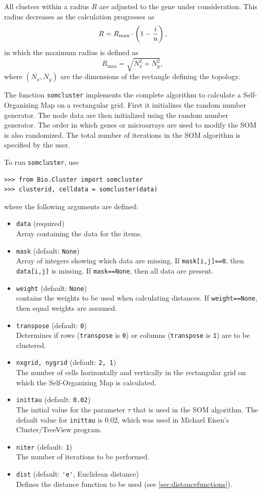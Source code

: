 \documentclass{report}
\begin{document}
All clusters within a radius $R$ are adjusted to the gene under consideration. This radius decreases as the calculation progresses as
$$R = R_{\textrm{max}} \cdot \left(1 - {i \over n}\right),$$
in which the maximum radius is defined as
$$R_{\textrm{max}} = \sqrt{N_x^2 + N_y^2},$$
where
$\left(N_x, N_y\right)$
are the dimensions of the rectangle defining the topology.

The function \verb|somcluster| implements the complete algorithm to calculate a Self-Organizing Map on a rectangular grid. First it initializes the random number generator. The node data are then initialized using the random number generator. The order in which genes or microarrays are used to modify the SOM is also randomized. The total number of iterations in the SOM algorithm is specified by the user.

To run \verb|somcluster|, use
\begin{verbatim}
>>> from Bio.Cluster import somcluster
>>> clusterid, celldata = somcluster(data)
\end{verbatim}
where the following arguments are defined:
\begin{itemize}
\item \verb|data| (required) \\
Array containing the data for the items.
\item \verb|mask| (default: \verb|None|) \\
Array of integers showing which data are missing. If \verb|mask[i,j]==0|, then \verb|data[i,j]| is missing. If \verb|mask==None|, then all data are present.
\item \verb|weight| (default: \verb|None|) \\
contains the weights to be used when calculating distances. If \verb|weight==None|, then equal weights are assumed.
\item \verb|transpose| (default: \verb|0|) \\
Determines if rows (\verb|transpose| is \verb|0|) or columns (\verb|transpose| is \verb|1|) are to be clustered.
\item \verb|nxgrid, nygrid| (default: \verb|2, 1|) \\
The number of cells horizontally and vertically in the rectangular grid on which the Self-Organizing Map is calculated.
\item \verb|inittau| (default: \verb|0.02|) \\
The initial value for the parameter $\tau$ that is used in the SOM algorithm. The default value for \verb|inittau| is 0.02, which was used in Michael Eisen's Cluster/TreeView program.
\item \verb|niter| (default: \verb|1|) \\
The number of iterations to be performed.
\item \verb|dist| (default: \verb|'e'|, Euclidean distance) \\
Defines the distance function to be used (see \ref{sec:distancefunctions}).
\end{itemize}
\end{document}
